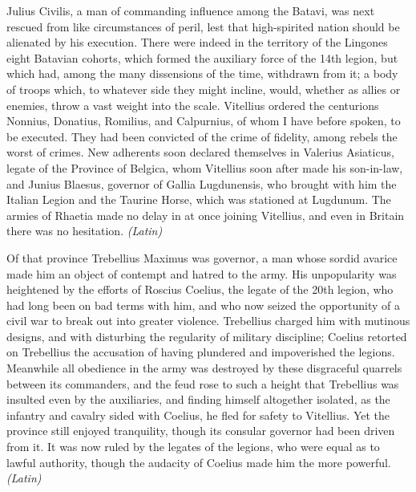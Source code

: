 
Julius Civilis, a man of commanding influence among the Batavi, was next rescued from like circumstances of peril, lest that high-spirited nation should be alienated by his execution. There were indeed in the territory of the Lingones eight Batavian cohorts, which formed the auxiliary force of the 14th legion, but which had, among the many dissensions of the time, withdrawn from it; a body of troops which, to whatever side they might incline, would, whether as allies or enemies, throw a vast weight into the scale. Vitellius ordered the centurions Nonnius, Donatius, Romilius, and Calpurnius, of whom I have before spoken, to be executed. They had been convicted of the crime of fidelity, among rebels the worst of crimes. New adherents soon declared themselves in Valerius Asiaticus, legate of the Province of Belgica, whom Vitellius soon after made his son-in-law, and Junius Blaesus, governor of Gallia Lugdunensis, who brought with him the Italian Legion and the Taurine Horse, which was stationed at Lugdunum. The armies of Rhaetia made no delay in at once joining Vitellius, and even in Britain there was no hesitation. \emph{(Latin)}


Of that province Trebellius Maximus was governor, a man whose sordid avarice made him an object of contempt and hatred to the army. His unpopularity was heightened by the efforts of Roscius Coelius, the legate of the 20th legion, who had long been on bad terms with him, and who now seized the opportunity of a civil war to break out into greater violence. Trebellius charged him with mutinous designs, and with disturbing the regularity of military discipline; Coelius retorted on Trebellius the accusation of having plundered and impoverished the legions. Meanwhile all obedience in the army was destroyed by these disgraceful quarrels between its commanders, and the feud rose to such a height that Trebellius was insulted even by the auxiliaries, and finding himself altogether isolated, as the infantry and cavalry sided with Coelius, he fled for safety to Vitellius. Yet the province still enjoyed tranquility, though its consular governor had been driven from it. It was now ruled by the legates of the legions, who were equal as to lawful authority, though the audacity of Coelius made him the more powerful. \emph{(Latin)}


